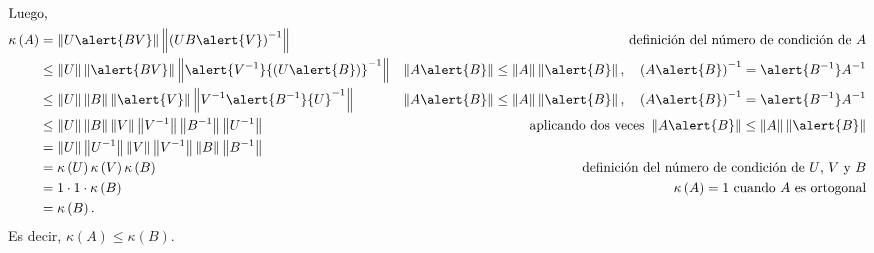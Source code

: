 \documentclass[
	spanish,
	8pt,
	utf8,
	xcolor=table,
	handout,
	aspectratio=169,
	professionalfonts,
	mathserif,
	leqno,
]{beamer}
\begin{document}
\begin{frame}
\begin{solution}
		\begin{align*}
			\shortintertext{Luego,}
			\kappa\left(A\right)                            & =
			\left\|
			U\alert{BV}
			\right\|
			\left\|
			{\left(UB\alert{V}\right)}^{-1}
			\right\|                                        &
			\text{definición del número de condición de $A$}            \\
			                                                & \leq
			\left\|
			U
			\right\|
			\left\|
			\alert{BV}
			\right\|
			\left\|
			\alert{{V}^{-1}}{\left(U\alert{B}\right)}^{-1}
			\right\|                                        &
			\left\|A\alert{B}\right\|\leq
			\left\|A\right\|\left\|\alert{B}\right\|,\quad
			{\left(A\alert{B}\right)}^{-1}=\alert{B^{-1}}A^{-1}         \\
			                                                & \leq
			\left\|U\right\|
			\left\|B\right\|
			\left\|
			\alert{V}
			\right\|
			\left\|{V}^{-1}\alert{{B}^{-1}}{U}^{-1}\right\| &
			\left\|A\alert{B}\right\|\leq
			\left\|A\right\|\left\|\alert{B}\right\|,\quad
			{\left(A\alert{B}\right)}^{-1}=\alert{B^{-1}}A^{-1}         \\
			                                                & \leq
			\left\|U\right\|
			\left\|B\right\|
			\left\|V\right\|
			\left\|{V}^{-1}\right\|
			\left\|{B}^{-1}\right\|
			\left\|{U}^{-1}\right\|                         &
			\text{aplicando dos veces }
			\left\|A\alert{B}\right\|\leq
			\left\|A\right\|\left\|\alert{B}\right\|                    \\
			                                                & =
			\left\|U\right\|
			\left\|{U}^{-1}\right\|
			\left\|V\right\|
			\left\|{V}^{-1}\right\|
			\left\|B\right\|
			\left\|{B}^{-1}\right\|                         &           \\
			                                                & =
			\kappa\left(U\right)
			\kappa\left(V\right)
			\kappa\left(B\right)                            &
			\text{definición del número de condición de $U$, $V$ y $B$} \\
			                                                & =
			1\cdot 1\cdot\kappa\left(B\right)               &
			\text{$\kappa\left(A\right)=1$ cuando $A$ es ortogonal}     \\
			                                                & =
			\kappa\left(B\right).
		\end{align*}
		Es decir, $\kappa\left(A\right)\leq \kappa\left(B\right)$.
	\end{solution}
\end{frame}
\end{document}
